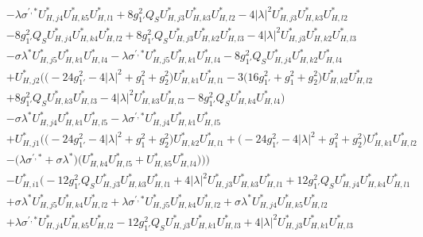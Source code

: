 \begin{align}
 &- \lambda \sigma^{\prime,*} U^*_{{H},{j 4}} U^*_{{H},{k 5}} U^*_{{H},{l 1}} +8 g_{1'}^{2} Q_{S} U^*_{{H},{j 3}} U^*_{{H},{k 3}} U^*_{{H},{l 2}} -4 |\lambda|^2 U^*_{{H},{j 3}} U^*_{{H},{k 3}} U^*_{{H},{l 2}} \nonumber \\ 
 &-8 g_{1'}^{2} Q_{S} U^*_{{H},{j 4}} U^*_{{H},{k 4}} U^*_{{H},{l 2}} +8 g_{1'}^{2} Q_{S} U^*_{{H},{j 3}} U^*_{{H},{k 2}} U^*_{{H},{l 3}} -4 |\lambda|^2 U^*_{{H},{j 3}} U^*_{{H},{k 2}} U^*_{{H},{l 3}} \nonumber \\ 
 &- \sigma \lambda^* U^*_{{H},{j 5}} U^*_{{H},{k 1}} U^*_{{H},{l 4}} - \lambda \sigma^{\prime,*} U^*_{{H},{j 5}} U^*_{{H},{k 1}} U^*_{{H},{l 4}} -8 g_{1'}^{2} Q_{S} U^*_{{H},{j 4}} U^*_{{H},{k 2}} U^*_{{H},{l 4}} \nonumber \\ 
 &+U^*_{{H},{j 2}} \Big(\Big(-24 g_{1'}^{2}  -4 |\lambda|^2  + g_{1}^{2} + g_{2}^{2}\Big)U^*_{{H},{k 1}} U^*_{{H},{l 1}} -3 \Big(16 g_{1'}^{2}  + g_{1}^{2} + g_{2}^{2}\Big)U^*_{{H},{k 2}} U^*_{{H},{l 2}} \nonumber \\ 
 &+8 g_{1'}^{2} Q_{S} U^*_{{H},{k 3}} U^*_{{H},{l 3}} -4 |\lambda|^2 U^*_{{H},{k 3}} U^*_{{H},{l 3}} -8 g_{1'}^{2} Q_{S} U^*_{{H},{k 4}} U^*_{{H},{l 4}} \Big)\nonumber \\ 
 &- \sigma \lambda^* U^*_{{H},{j 4}} U^*_{{H},{k 1}} U^*_{{H},{l 5}} - \lambda \sigma^{\prime,*} U^*_{{H},{j 4}} U^*_{{H},{k 1}} U^*_{{H},{l 5}} \nonumber \\ 
 &+U^*_{{H},{j 1}} \Big(\Big(-24 g_{1'}^{2}  -4 |\lambda|^2  + g_{1}^{2} + g_{2}^{2}\Big)U^*_{{H},{k 2}} U^*_{{H},{l 1}} +\Big(-24 g_{1'}^{2}  -4 |\lambda|^2  + g_{1}^{2} + g_{2}^{2}\Big)U^*_{{H},{k 1}} U^*_{{H},{l 2}} \nonumber \\ 
 &- \Big(\lambda \sigma^{\prime,*}  + \sigma \lambda^* \Big)\Big(U^*_{{H},{k 4}} U^*_{{H},{l 5}}  + U^*_{{H},{k 5}} U^*_{{H},{l 4}} \Big)\Big)\Big)\nonumber \\ 
 &- U^*_{{H},{i 1}} \Big(-12 g_{1'}^{2} Q_{S} U^*_{{H},{j 3}} U^*_{{H},{k 3}} U^*_{{H},{l 1}} +4 |\lambda|^2 U^*_{{H},{j 3}} U^*_{{H},{k 3}} U^*_{{H},{l 1}} +12 g_{1'}^{2} Q_{S} U^*_{{H},{j 4}} U^*_{{H},{k 4}} U^*_{{H},{l 1}} \nonumber \\ 
 &+\sigma \lambda^* U^*_{{H},{j 5}} U^*_{{H},{k 4}} U^*_{{H},{l 2}} +\lambda \sigma^{\prime,*} U^*_{{H},{j 5}} U^*_{{H},{k 4}} U^*_{{H},{l 2}} +\sigma \lambda^* U^*_{{H},{j 4}} U^*_{{H},{k 5}} U^*_{{H},{l 2}} \nonumber \\ 
 &+\lambda \sigma^{\prime,*} U^*_{{H},{j 4}} U^*_{{H},{k 5}} U^*_{{H},{l 2}} -12 g_{1'}^{2} Q_{S} U^*_{{H},{j 3}} U^*_{{H},{k 1}} U^*_{{H},{l 3}} +4 |\lambda|^2 U^*_{{H},{j 3}} U^*_{{H},{k 1}} U^*_{{H},{l 3}} \nonumber \\ 

\end{align}
